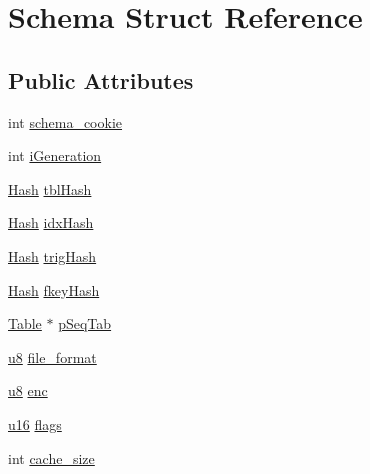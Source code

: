 \hypertarget{struct_schema}{\section{Schema Struct Reference}
\label{struct_schema}
}
\subsection*{Public Attributes}
\begin{DoxyCompactItemize}
\item 
int \hyperlink{struct_schema_a3eef54a64f4f962d64577646bd34a47c}{schema\-\_\-cookie}
\item 
int \hyperlink{struct_schema_a879b1597656c7cbcbb98cdb88e876874}{i\-Generation}
\item 
\hyperlink{struct_hash}{Hash} \hyperlink{struct_schema_af841eadc93b289944b95f72b784bfaae}{tbl\-Hash}
\item 
\hyperlink{struct_hash}{Hash} \hyperlink{struct_schema_ac0dd242f486d17ddadca1e47af76c6c5}{idx\-Hash}
\item 
\hyperlink{struct_hash}{Hash} \hyperlink{struct_schema_ab521f4545d200329d8e1a46bbb67e7c5}{trig\-Hash}
\item 
\hyperlink{struct_hash}{Hash} \hyperlink{struct_schema_ad51ed96351701cfe8d9e871722827c11}{fkey\-Hash}
\item 
\hyperlink{struct_table}{Table} $\ast$ \hyperlink{struct_schema_ad580e4e662724bee95571d297f94da37}{p\-Seq\-Tab}
\item 
\hyperlink{sqlite3_8c_a74a0f6424ae628af25f23f0a35f6ead3}{u8} \hyperlink{struct_schema_ab9f0371436e41b3080772995407a4cca}{file\-\_\-format}
\item 
\hyperlink{sqlite3_8c_a74a0f6424ae628af25f23f0a35f6ead3}{u8} \hyperlink{struct_schema_a1338d09fe9cbb5a8162929202cb73cae}{enc}
\item 
\hyperlink{sqlite3_8c_a20f2299e322dcbde37cb07b16910b843}{u16} \hyperlink{struct_schema_a14838766a0a438e590a27f300beff459}{flags}
\item 
int \hyperlink{struct_schema_a0a66691be95a30c099ca4840da7110dd}{cache\-\_\-size}
\end{DoxyCompactItemize}


